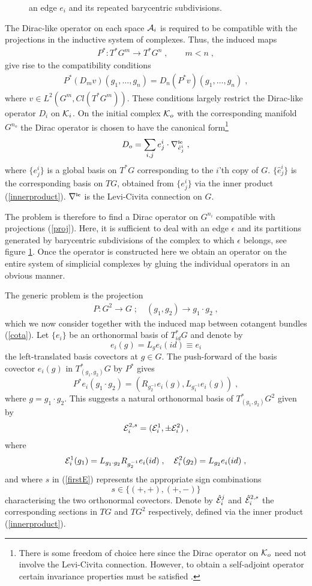 \documentclass[12pt]{article}
\newcommand{\ba}{\begin{eqnarray}}
\newcommand{\ea}{\end{eqnarray}}
\def\e{\epsilon}
\def\ca{{\cal A}}
\def\ce{{\cal E}}
\def\ck{{\cal K}}
\newcommand{\levi}{\nabla^{\mbox{\tiny\bf lc}}}
\begin{document}
\begin{figure} [t]
\begin{center}
 
\caption{an edge $e_i$ and its repeated barycentric subdivisions.}
\label{FigContBary}
\end{center}
\end{figure}



The Dirac-like operator on each space $\ca_{i}$ is required to be compatible with the projections in the inductive system of complexes. Thus, the induced maps
\ba 
P^*: T^*G^m\rightarrow T^*G^n\;,\quad \quad m<n\;,
\label{PrOj}
\ea
give rise to the compatibility conditions 
\ba
P^* (D_m v)(g_1,\ldots,g_n) = D_n (P^*v)(g_1,\ldots,g_n) \;,
\label{kom}
\ea
where $v\in L^2(G^m,Cl(T^*G^m))$. These conditions largely restrict the Dirac-like operator $D_i$ on $\ck_i$. On the initial complex $\ck_o$ with the corresponding manifold $G^{n_o}$ the Dirac operator is chosen to have the canonical form\footnote{There is some freedom of choice here since the Dirac operator on $\ck_o$ need not involve the Levi-Civita connection. However, to obtain a self-adjoint operator certain invariance properties must be satisfied \cite{Aastrup}.}
\ba
D_o = \sum_{i,j} e^i_j\cdot \levi_{\hat{e}^i_j}\;,
\label{dirac1}
\ea
where $\{e_j^i\}$ is a global basis on $T^*G$ corresponding to the $i$'th copy of $G$. $\{\hat{e}^i_j\}$ is the corresponding basis on $TG$, obtained from $\{e_j^i\}$ via the inner product (\ref{innerproduct}). $\levi$ is the Levi-Civita connection on $G$. 

The problem is therefore to find a Dirac operator on $G^{n_i}$ compatible with projections (\ref{proj}). Here, it is sufficient to deal with an edge $\e$ and its partitions generated by barycentric subdivisions of the complex to which $\e$ belongs, see figure \ref{FigContBary}. Once the operator is constructed here we obtain an operator on the entire system of simplicial complexes by gluing the individual operators in an obvious manner.

The generic problem is the projection 
\ba
P:G^2\rightarrow G\;;\quad (g_1,g_2)\rightarrow g_1\cdot g_2\;,
\label{proje}
\ea
which we now consider together with the induced map between cotangent bundles (\ref{cota}).
Let $\{e_i\}$ be an orthonormal basis of $T^*_{id}G$ and denote by
\[
e_i(g) = L_g e_i (id)\equiv e_i
\]
the left-translated basis covectors at $g\in G$.
The push-forward of the basis covector $e_i(g)$ in $T^*_{(g_1,g_2)} G$ by $P^*$ gives
\[
P^*e_i(g_1\cdot g_2)=(R_{g_2^{-1}}e_i(g),L_{g_1^{-1}}e_i(g))\;,
\]
where $g=g_1\cdot g_2$. This suggests a natural orthonormal basis of $T^*_{(g_1,g_2)}G^2$ given by
\ba 
\ce^{2,s}_i=(\ce_i^1,\pm\ce_i^2)\;,
\label{firstE}
\ea
where
\ba
\ce_i^1(g_1)=L_{g_1\cdot g_2}R_{g_2^{-1}}e_i(id)\;,\quad \ce_i^2(g_2)=L_{g_2}e_i(id)\;,
\label{ba1}
\ea
and where $s$ in (\ref{firstE}) represents the appropriate sign combinations
\[
s\in\{ (+,+), (+,-) \}
\]
characterising the two orthonormal covectors. Denote by $\hat{\ce}^j_i$ and $\hat{\ce}^{2,s}_i$ the corresponding sections in $TG$ and $TG^2$ respectively, defined via the inner product (\ref{innerproduct}). 
\end{document}

